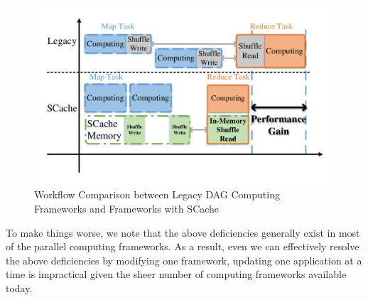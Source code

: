 \begin{figure}
	\centering
	\includegraphics[width=\linewidth]{fig/workflow}
	\caption{Workflow Comparison between Legacy DAG Computing Frameworks and Frameworks with SCache}
	\label{fig:workflow}
\end{figure}
To make things worse, we note that the above deficiencies generally exist in most of the parallel computing frameworks. As a result, even we can effectively resolve the above deficiencies by modifying one framework, updating one application at a time is impractical given the sheer number of computing frameworks available today.

